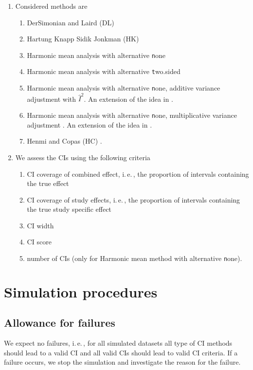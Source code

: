 \documentclass[letterpaper, 9pt]{article}
\newcommand{\ie}{{i.\,e.\,}}
\begin{document}
\begin{enumerate}
\item Considered methods are
\begin{enumerate}
\item DerSimonian and Laird (DL) \cite{ders:lair:86}
\item Hartung Knapp Sidik Jonkman (HK) \cite{IntHoutIoannidis}
\item Harmonic mean analysis with alternative {\texttt none} \cite{Held2020b}
\item Harmonic mean analysis with alternative {\texttt two.sided} \cite{Held2020b}
\item Harmonic mean analysis with alternative {\texttt none}, additive variance adjustment with $\hat I^2$. An extension of the idea in \cite{Held2020b}. 
\item Harmonic mean analysis with alternative {\texttt none}, multiplicative variance adjustment \cite{mawd:etal:17}.
  An extension of the idea in \cite{Held2020b}. 
\item Henmi and Copas (HC) \cite{henm:copa:10}.
\end{enumerate}
\item We assess the CIs using the following criteria
  \begin{enumerate}
  \item CI coverage of combined effect, \ie, the proportion of intervals containing the true effect
  \item CI coverage of study effects, \ie, the proportion of intervals containing the true study specific effect
  \item CI width 
  \item CI score \cite{Gnei:Raft:07}
  \item number of CIs (only for Harmonic mean method with alternative {\texttt none}).
  \end{enumerate}
\end{enumerate}






\section{Simulation procedures}


\subsection{Allowance for failures}
We expect no failures, \ie, for all simulated datasets all type of CI methods should lead to a valid CI and all valid CIs should lead to valid CI criteria.
If a failure occurs, we stop the simulation and investigate the reason for the failure. 
\end{document}
